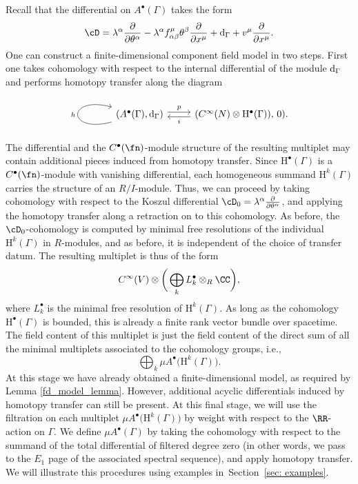 \documentclass[10pt,a4paper]{amsart}
\numberwithin{equation}{section}
\def\bu{\bullet}
\def\d{{\rm d}}
\begin{document}
Recall that the differential on $A^\bullet(\Gamma)$ takes the form
\begin{equation*}
\cD = \lambda^\alpha \frac{\partial}{\partial \theta^\alpha} - \lambda^\alpha f^\mu_{\alpha \beta} \theta^\beta \frac{\partial}{\partial x^\mu} + \d_\Gamma + v^\mu
\frac{\partial}{\partial x^\mu} .
\end{equation*}
One can construct a finite-dimensional component field model in two steps. First one takes cohomology with respect to the internal differential of the module $\d_\Gamma$ and performs homotopy transfer along the diagram
\begin{equation*}
\begin{tikzcd}
\arrow[loop left]{l}{h}(A^\bullet (\Gamma) , \d_\Gamma)\arrow[r, shift left, "p"] &(C^\infty(N) \otimes \mathrm H^\bullet(\Gamma) ) , \, 0)\arrow[l, shift left, "i"] .
\end{tikzcd}
\end{equation*}
The differential and the $C^\bullet(\fn)$-module structure of the resulting multiplet may contain additional pieces induced from homotopy transfer. Since $\mathrm H^\bullet(\Gamma)$ is a $C^\bullet(\fn)$-module with vanishing differential, each homogeneous summand $\mathrm H^k(\Gamma)$ carries the structure of an $R/I$-module. Thus, we can proceed by taking cohomology with respect to the Koszul differential $\cD_0 = \lambda^\alpha \frac{\partial}{\partial \theta^\alpha}$, and applying the homotopy transfer along a retraction on to this cohomology. As before, the $\cD_0$-cohomology is computed by minimal free resolutions of the individual $\mathrm H^k(\Gamma)$ in $R$-modules, and as before, it is independent of the choice of transfer datum. The resulting multiplet is thus of the form
\begin{equation*}
C^\infty(V) \otimes \bigg(\bigoplus_k L^\bullet_k \otimes_R \CC\bigg) ,
\end{equation*}
where $L^\bullet_k$ is the minimal free resolution of $\mathrm H^k(\Gamma)$. As long as the cohomology $\mathrm H^\bullet(\Gamma)$ is bounded, this is already a finite rank vector bundle over spacetime. The field content of this multiplet is just the field content of the direct sum of all the minimal multiplets associated to the cohomology groups, i.e.,
\begin{equation*}
\bigoplus_k \mu A^\bu\big(\mathrm H^k(\Gamma)\big) .
\end{equation*}
At this stage we have already obtained a finite-dimensional model, as required by Lemma \ref{fd_model_lemma}. However, additional acyclic differentials induced by homotopy transfer can still be present. At this final stage, we will use the filtration on each multiplet $\mu A^\bu\big(\mathrm H^k(\Gamma)\big)$ by weight with respect to the $\RR$-action on $\Gamma$. We define $\mu A^\bullet(\Gamma)$ by taking the cohomology with respect to the summand of the total differential of filtered degree zero (in other words, we pass to the $E_1$ page of the associated spectral sequence), and apply homotopy transfer. We will illustrate this procedures using examples in~Section~\ref{sec: examples}.
\end{document}
